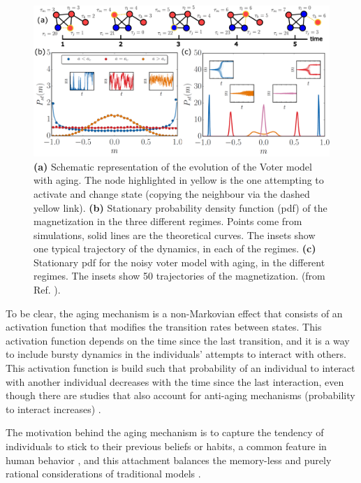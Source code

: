\begin{figure}
    \centering
    \captionsetup{font=sf}
    \includegraphics[width=\textwidth]{Figs/Introduction/aging_plot.pdf}
    \caption[Aging in the Voter model]{\textbf{(a)} Schematic representation of the evolution of the Voter model with aging. The node highlighted in yellow is the one attempting to activate and change state (copying the neighbour via the dashed yellow link). \textbf{(b)} Stationary probability density function (pdf) of the magnetization in the three different regimes. Points come from simulations, solid lines are the theoretical curves. The insets show one typical trajectory of the dynamics, in each of the regimes. \textbf{(c)} Stationary pdf for the noisy voter model with aging, in the different regimes. The insets show 50 trajectories of the magnetization. (from Ref. \cite{artime-2017}).}
    \label{fig:aging_pdf}
\end{figure}

To be clear, the aging mechanism is a non-Markovian effect that consists of an activation function that modifies the transition rates between states. This activation function depends on the time since the last transition, and it is a way to include bursty dynamics in the individuals' attempts to interact with others. This activation function is build such that probability of an individual to interact with another individual decreases with the time since the last interaction, even though there are studies that also account for anti-aging mechanisms (probability to interact increases) \cite{peralta-2020,chen-2020}.

The motivation behind the aging mechanism is to capture the tendency of individuals to stick to their previous beliefs or habits, a common feature in human behavior \cite{granovetter-1973}, and this attachment balances the memory-less and purely rational considerations of traditional models \cite{granovetter-1985}.

